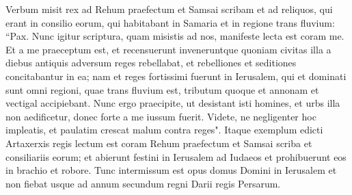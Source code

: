 \begin{biblechapter}
\verse Verbum misit rex ad Rehum praefectum et Samsai scribam et ad reliquos, qui erant in consilio eorum, qui habitabant in Samaria et in regione trans fluvium: “Pax. Nunc igitur scriptura, 
\verse quam misistis ad nos, manifeste lecta est coram me. 
\verse Et a me praeceptum est, et recensuerunt inveneruntque quoniam civitas illa a diebus antiquis adversum reges rebellabat, et rebelliones et seditiones concitabantur in ea; 
\verse nam et reges fortissimi fuerunt in Ierusalem, qui et dominati sunt omni regioni, quae trans fluvium est, tributum quoque et annonam et vectigal accipiebant. 
\verse Nunc ergo praecipite, ut desistant isti homines, et urbs illa non aedificetur, donec forte a me iussum fuerit. 
\verse Videte, ne negligenter hoc impleatis, et paulatim crescat malum contra reges". 
\verse Itaque exemplum edicti Artaxerxis regis lectum est coram Rehum praefectum et Samsai scriba et consiliariis eorum; et abierunt festini in Ierusalem ad Iudaeos et prohibuerunt eos in brachio et robore. 
\verse Tunc intermissum est opus domus Domini in Ierusalem et non fiebat usque ad annum secundum regni Darii regis Persarum. 
\end{biblechapter}

